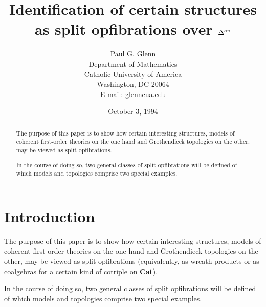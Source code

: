  \headsep 0in   \textwidth 
6.5in 
\setlength{\unitlength}{1cm}

\def\D{\displaystyle}
\def\NI{\noindent}

\newtheorem{thm}{Theorem}
\newtheorem{lem}{Lemma}
\newtheorem{DEFN}{Definition}
\def\qed{\rule{2mm}{2mm}}
\def\SOF{split opfibration}
\def\BC#1{{\bf \cal #1}}
\def\MON{\hookrightarrow}
\def\COP#1{{\bf \cal #1}^{\rm op}}
\def\OP{\mbox{\small op}}
\def\AMC#1#2#3{{\BC #1}_{{#2},{\BC #3}}} \def\ACT#1#2#3{{\BC 
#1}_{{\BC #2},#3}}





\title{Identification of certain structures as split opfibrations 
over $\Delta^{\rm op}$}

\author{Paul G. Glenn\\Department of Mathematics\\Catholic University 
of America\\Washington, DC 20064\\E-mail: glenncua.edu} 

\date{October 3, 1994}

\maketitle
\begin{abstract}
The purpose of this paper is to show how certain interesting 
structures, models of coherent first-order theories on the one hand 
and Grothendieck topologies on the other, may be viewed as split 
opfibrations.

In the course of doing so, two general classes of \SOF s will be 
defined of which models and topologies comprise two special examples. 
\end{abstract}
\tableofcontents

\section{Introduction}

The purpose of this paper is to show how certain interesting 
structures, models of coherent first-order theories on the one hand 
and Grothendieck topologies on the other, may be viewed as split 
opfibrations (equivalently, as wreath products or as coalgebras for a 
certain kind of cotriple on {\bf Cat}).

In the course of doing so, two general classes of \SOF s will be 
defined of which models and topologies comprise two special examples. 

